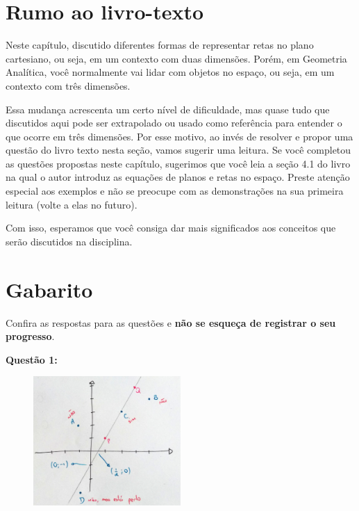 \documentclass[main_estudante.tex]{subfiles}
\begin{document}
\newpage

\section{Rumo ao livro-texto}

Neste capítulo, discutido diferentes formas de representar retas no plano cartesiano, ou seja, em um contexto com duas dimensões. Porém, em Geometria Analítica, você normalmente vai lidar com objetos no espaço, ou seja, em um contexto com três dimensões.

Essa mudança acrescenta um certo nível de dificuldade, mas quase tudo que discutidos aqui pode ser extrapolado ou usado como referência para entender o que ocorre em três dimensões. Por esse motivo, ao invés de resolver e propor uma questão do livro texto nesta seção, vamos sugerir uma leitura. Se você completou as questões propostas neste capítulo, sugerimos que você leia a seção 4.1 do livro  na qual o autor introduz as equações de planos e retas no espaço. Preste atenção especial aos exemplos e não se preocupe com as demonstrações na sua primeira leitura (volte a elas no futuro).

Com isso, esperamos que você consiga dar mais significados aos conceitos que serão discutidos na disciplina.

\newpage

\section{Gabarito}

Confira as respostas para as questões e \textbf{não se esqueça de registrar o seu progresso}.

\noindent\textbf{Questão 1:} 

\begin{figure}[h]
\centering
\includegraphics[width=0.5\textwidth]{./img/c6g1.jpg}
\end{figure}
\end{document}
